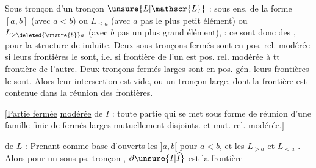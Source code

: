Sous tronçon  d'un tronçon $\unsure{L|\mathscr{L}}$ : sous ens. de la forme $[a,b]$ (avec $a<b$) ou $L_{\leq a}$ (avec $a$ pas le plus petit élément) ou $L_{\geq\deleted{\unsure{b}}a}$ (avec $b$ pas un plus grand élément),  : ce sont donc des , pour la structure de  induite.
 Deux sous-tronçons fermés sont  en pos. rel. modérée si leurs frontières le sont, i.e. si    frontière de l'un est  pos. rel. modérée à tt  frontière de l'autre.
  Deux tronçons fermés larges sont en pos. gén.  leurs frontières  le sont.
Alors leur intersection est vide,  ou un  tronçon large, dont la frontière est contenue dans  la réunion des frontières.

$\bigl[$\uline{Partie fermée} \uline{modérée} de $I$ : toute partie qui se met sous forme de réunion d'une famille finie de  fermés larges mutuellement disjoints. et mut.  rel. modérée.$\bigr]$

 de $L$  : Prenant comme base d'ouverts les  $]a,b[$ pour $a<b$, et les $L_{>a}$ et $L_{<a}$ \unsure{(}. Alors  pour un sous-ps. tronçon , $\partial\unsure{I|\widehat I}$ est la frontière
\margin{\uline{NB} Il n'y a pas besoin d'introduire les $L_{>a}$ \unsure{et} si $L$ \unsure{n'a} pas de plus grand élément, et \unsure{itou|idem} pour $L_{<a}$ si \unsure{$a$|$L$} n'a pas de \unsure{plus} petit élément. \unsure{Dans ce cas|Dans} \illegible{2} $]a,b[$ \unsure{eux} \illegible{2} $]a,b[$.}
